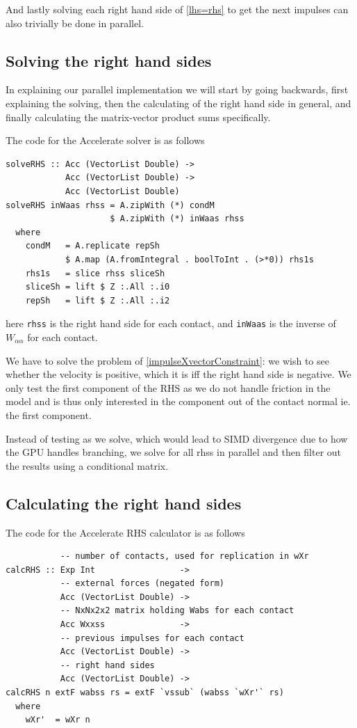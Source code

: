 \documentclass[runningheads,a4paper]{llncs}
\begin{document}
And lastly solving each right hand side of \eqref{lhs=rhs}
to get the next impulses can also trivially be done in parallel.

\subsection{Solving the right hand sides}
In explaining our parallel implementation we will start
by going backwards, first explaining the solving,
then the calculating of the right hand side in general,
and finally calculating the matrix-vector product sums specifically.

The code for the Accelerate solver is as follows
\begin{verbatim}
solveRHS :: Acc (VectorList Double) -> 
            Acc (VectorList Double) -> 
            Acc (VectorList Double)
solveRHS inWaas rhss = A.zipWith (*) condM 
                     $ A.zipWith (*) inWaas rhss
  where
    condM   = A.replicate repSh 
            $ A.map (A.fromIntegral . boolToInt . (>*0)) rhs1s
    rhs1s   = slice rhss sliceSh
    sliceSh = lift $ Z :.All :.i0
    repSh   = lift $ Z :.All :.i2
\end{verbatim}
here \texttt{rhss} is the right hand side for each contact,
and \texttt{inWaas} is the inverse of $W_{\alpha\alpha}$ for each contact.

We have to solve the problem of \eqref{impulseXvectorConstraint}:
we wish to see whether the velocity is positive,
which it is iff the right hand side is negative.
We only test the first component of the RHS
as we do not handle friction in the model and is thus only interested
in the component out of the contact normal ie. the first component.

Instead of testing as we solve,
which would lead to SIMD divergence due to how the GPU handles branching,
we solve for all rhss in parallel and then filter out the results
using a conditional matrix.

\subsection{Calculating the right hand sides}
The code for the Accelerate RHS calculator is as follows
\begin{verbatim}
           -- number of contacts, used for replication in wXr
calcRHS :: Exp Int                 ->
           -- external forces (negated form)
           Acc (VectorList Double) ->
           -- NxNx2x2 matrix holding Wabs for each contact
           Acc Wxxss               ->
           -- previous impulses for each contact
           Acc (VectorList Double) ->
           -- right hand sides
           Acc (VectorList Double) ->
calcRHS n extF wabss rs = extF `vssub` (wabss `wXr'` rs)
  where
    wXr'  = wXr n
\end{verbatim}
\end{document}
